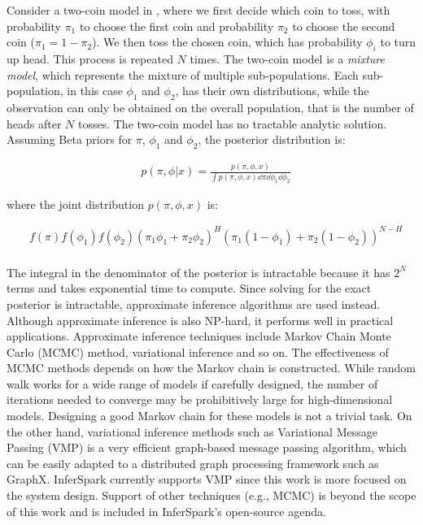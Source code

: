 Consider a two-coin model in , where we first decide
which coin to toss, with probability $\pi_1$ to choose the first coin and
probability $\pi_2$ to choose the second coin ($\pi_1 = 1 - \pi_2$). 
We then toss the chosen coin, which has probability $\phi_i$ to turn up head. 
This process is repeated $N$ times. The two-coin model is
a {\em mixture model}, which represents the
mixture of multiple sub-populations. Each sub-population, in this case
$\phi_1$ and $\phi_2$, has their own distributions, 
while the observation can only be obtained on the overall population, that is
the number of heads after $N$ tosses. 
The two-coin model has no tractable analytic solution. 
Assuming Beta priors for $\pi$, $\phi_{1}$ and $\phi_{2}$, 
the posterior distribution is:

\begin{align*}
	&p(\pi, \phi | x) = \frac{p(\pi, \phi, x)}{\int p(\pi, \phi, x) \dd \pi \dd
\phi_1 \dd \phi_2}
\end{align*}

\noindent
where the joint distribution $p(\pi, \phi, x)$ is:

\begin{align*}
	&f(\pi)f(\phi_1)f(\phi_2)(\pi_1 \phi_1 + \pi_2 \phi_2)^H (\pi_1
	(1-\phi_1) + \pi_2 (1- \phi_2))^{N-H} \\
\end{align*}


The integral in the denominator of the posterior is intractable 
because it has $2^N$ terms and takes exponential time to compute.  
Since solving for the exact posterior is
intractable, approximate inference algorithms are used instead.
Although approximate inference is also NP-hard, it performs well in 
practical applications. 
Approximate inference techniques include Markov Chain Monte Carlo (MCMC) 
method, variational inference and so on.
The effectiveness of MCMC methods depends on how the Markov chain is
constructed. While random walk works for a wide range of models if carefully
designed, the number of iterations needed to converge may be prohibitively
large for high-dimensional models. Designing a good Markov chain for these
models is not a trivial task.
On the other hand, variational inference methods such as
Variational Message Passing (VMP) 
is a very efficient graph-based message passing algorithm, 
which can be easily adapted to a distributed graph processing framework such as
GraphX. 
InferSpark currently supports VMP since this work is more focused on the
system design.
Support of other techniques (e.g., MCMC) is beyond the scope of this work and
is included in InferSpark's open-source agenda.

